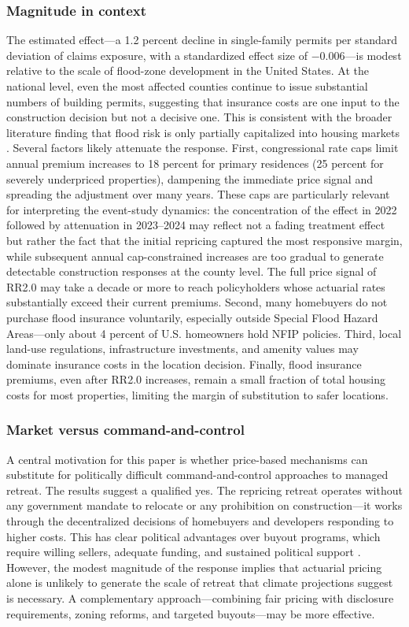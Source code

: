 \documentclass[12pt]{article}
\begin{document}
\subsubsection*{Magnitude in context} The estimated effect---a 1.2 percent decline in single-family permits per standard deviation of claims exposure, with a standardized effect size of $-0.006$---is modest relative to the scale of flood-zone development in the United States. At the national level, even the most affected counties continue to issue substantial numbers of building permits, suggesting that insurance costs are one input to the construction decision but not a decisive one. This is consistent with the broader literature finding that flood risk is only partially capitalized into housing markets \citep{bernstein2019, murfin2020}. Several factors likely attenuate the response. First, congressional rate caps limit annual premium increases to 18 percent for primary residences (25 percent for severely underpriced properties), dampening the immediate price signal and spreading the adjustment over many years. These caps are particularly relevant for interpreting the event-study dynamics: the concentration of the effect in 2022 followed by attenuation in 2023--2024 may reflect not a fading treatment effect but rather the fact that the initial repricing captured the most responsive margin, while subsequent annual cap-constrained increases are too gradual to generate detectable construction responses at the county level. The full price signal of RR2.0 may take a decade or more to reach policyholders whose actuarial rates substantially exceed their current premiums. Second, many homebuyers do not purchase flood insurance voluntarily, especially outside Special Flood Hazard Areas---only about 4 percent of U.S. homeowners hold NFIP policies. Third, local land-use regulations, infrastructure investments, and amenity values may dominate insurance costs in the location decision. Finally, flood insurance premiums, even after RR2.0 increases, remain a small fraction of total housing costs for most properties, limiting the margin of substitution to safer locations.

\subsubsection*{Market versus command-and-control} A central motivation for this paper is whether price-based mechanisms can substitute for politically difficult command-and-control approaches to managed retreat. The results suggest a qualified yes. The repricing retreat operates without any government mandate to relocate or any prohibition on construction---it works through the decentralized decisions of homebuyers and developers responding to higher costs. This has clear political advantages over buyout programs, which require willing sellers, adequate funding, and sustained political support \citep{hino2021}. However, the modest magnitude of the response implies that actuarial pricing alone is unlikely to generate the scale of retreat that climate projections suggest is necessary. A complementary approach---combining fair pricing with disclosure requirements, zoning reforms, and targeted buyouts---may be more effective.
\end{document}
